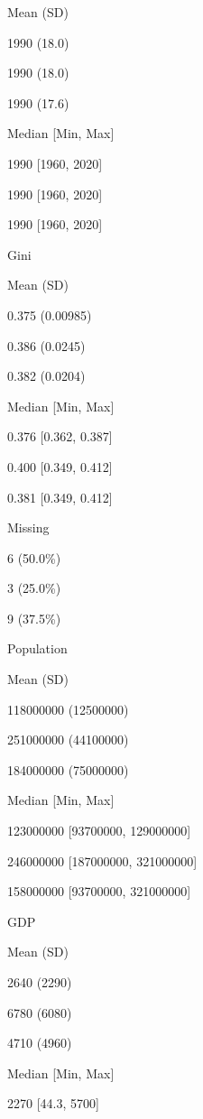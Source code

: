 \documentclass[
]{article}
\begin{document}
{ Mean (SD)}

{1990 (18.0)}

{1990 (18.0)}

{1990 (17.6)}

{ Median {[}Min, Max{]}}

{1990 {[}1960, 2020{]}}

{1990 {[}1960, 2020{]}}

{1990 {[}1960, 2020{]}}

{Gini}

{}

{}

{}

{ Mean (SD)}

{0.375 (0.00985)}

{0.386 (0.0245)}

{0.382 (0.0204)}

{ Median {[}Min, Max{]}}

{0.376 {[}0.362, 0.387{]}}

{0.400 {[}0.349, 0.412{]}}

{0.381 {[}0.349, 0.412{]}}

{ Missing}

{6 (50.0\%)}

{3 (25.0\%)}

{9 (37.5\%)}

{Population}

{}

{}

{}

{ Mean (SD)}

{118000000 (12500000)}

{251000000 (44100000)}

{184000000 (75000000)}

{ Median {[}Min, Max{]}}

{123000000 {[}93700000, 129000000{]}}

{246000000 {[}187000000, 321000000{]}}

{158000000 {[}93700000, 321000000{]}}

{GDP}

{}

{}

{}

{ Mean (SD)}

{2640 (2290)}

{6780 (6080)}

{4710 (4960)}

{ Median {[}Min, Max{]}}

{2270 {[}44.3, 5700{]}}
\end{document}
